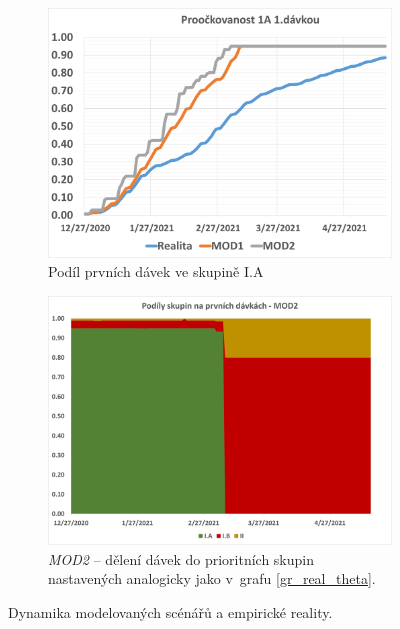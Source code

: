\begin{figure}
\centering


\begin{subfigure}{0.9\textwidth}
\includegraphics[width=\textwidth]{prispevky/080-Logistika_ockovani/assets/vetsi_popisky/gr_1A_proockovanost}
\caption{Podíl prvních dávek ve skupině I.A}
\label{gr_mod_prvni_davka}
\end{subfigure}

\begin{subfigure}{0.9\textwidth}
\includegraphics[width=\textwidth]{assets/theta_mod2}
\caption{\emph{MOD2} -- dělení dávek do prioritních skupin nastavených analogicky jako v~grafu \ref{gr_real_theta}.}
\label{gr_mod2_theta}
\end{subfigure}

\caption{Dynamika modelovaných scénářů a empirické reality.}

\end{figure}

